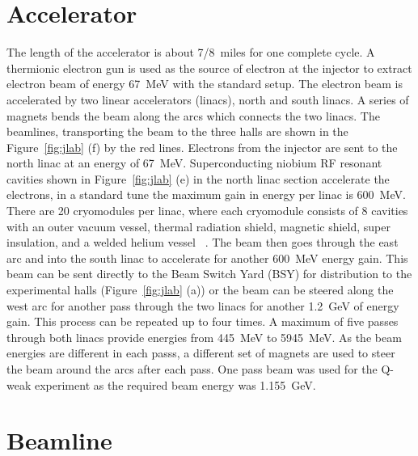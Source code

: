 \section{Accelerator}%
\label{Accelerator}

The length of the accelerator is about 7/8~miles for one complete cycle. A thermionic electron gun is used as the source of electron at the injector to extract electron beam of energy 67~MeV with the standard setup. 
The electron beam is accelerated by two linear accelerators (linacs), north and south linacs. A series of magnets bends the beam along the arcs which connects the two linacs. The beamlines, transporting the beam to the three halls are shown in the Figure~\ref{fig:jlab} (f) by the red lines. 
Electrons from the injector are sent to the north linac at an energy of 67~MeV. Superconducting niobium RF resonant cavities shown in Figure~\ref{fig:jlab} (e) in the north linac section accelerate the electrons, in a standard tune the maximum gain in energy per linac is 600~MeV. There are 20 cryomodules per linac, where each cryomodule consists of 8 cavities with an outer vacuum vessel, thermal radiation shield, magnetic shield, super insulation, and a welded helium vessel ~\cite{Leemann_CEBAF,kmyers_qweak}. The beam then goes through the east arc and into the south linac to accelerate for another 600~MeV energy gain. This beam can be sent directly to the Beam Switch Yard (BSY) for distribution to the experimental halls (Figure~\ref{fig:jlab} (a)) or the beam can be steered along the west arc for another pass through the two linacs for another 1.2~GeV of energy gain. This process can be repeated up to four times. A maximum of five passes  through both linacs provide energies from 445~MeV to 5945~MeV. As the beam energies are different in each passs, a different set of magnets are used to steer the beam around the arcs after each pass. One pass beam was used for the Q-weak experiment as the required beam energy was 1.155~GeV.

\section{Beamline}%
\label{Beamline}

